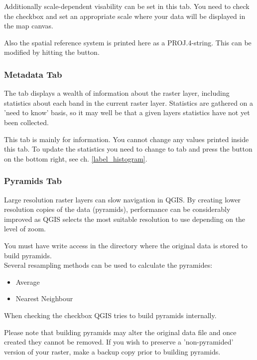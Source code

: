 Additionally scale-dependent visability can be set in this tab. You need to
check the checkbox and set an appropriate scale where your data will be
displayed in the map canvas.

Also the spatial reference system is printed here as a PROJ.4-string. 
This can be modified by hitting the  button.

\subsubsection{Metadata Tab}\label{label_metatab}

The  tab displays a wealth of information about the raster layer,
including statistics about each band in the current raster layer. Statistics
are gathered on a 'need to know' basis, so it may well be that a given layers
statistics have not yet been collected.

This tab is mainly for information. You cannot change any values printed
inside this tab. To update the statistics you need to change to tab
 and press the button  on the bottom right,
see ch. \ref{label_histogram}.

\subsubsection{Pyramids Tab}\label{raster_pyramids}

Large resolution raster layers can slow navigation in QGIS. By creating lower
resolution copies of the data (pyramids), performance can be considerably
improved as QGIS selects the most suitable resolution to use depending on the
level of zoom.

You must have write access in the directory where the original data is stored
to build pyramids. \\
Several resampling methods can be used to calculate the pyramides:
\begin{itemize}
\item Average
\item Nearest Neighbour
\end{itemize}

When checking the checkbox  QGIS tries to build pyramids internally.

Please note that building pyramids may alter the original data file and once
created they cannot be removed. If you wish to preserve a 'non-pyramided'
version of your raster, make a backup copy prior to building pyramids.

